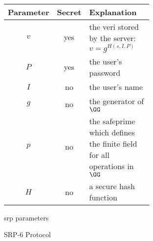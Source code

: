 \begin{figure}[H]
  \centering

  \begin{tabular}{ |c|c|p{0.7\linewidth}| }
    \hline
    Parameter & Secret & Explanation \\
    \hline
    $v$ & yes & the \gls{veri}\label{text:srp-verifier-generation} stored by the server: $v=g^{H(s,I,P)}$ \\ \hline
    $P$ & yes & the user's password \\ \hline
    $I$ & no & the user's name \\ \hline
    $g$ & no & the generator of $\GG$ \\ \hline
    $p$ & no & the \gls{safeprime} which defines the finite field for all operations in $\GG$ \\ \hline
    $H$ & no & a secure hash function \\ \hline
  \end{tabular}

  \caption{\gls{srp} parameters}
  \label{fig:srp-shared-params}
\end{figure}

\begin{figure}[H]

  \caption{SRP-6 Protocol}
  \label{fig:srp}
\end{figure}

\clearpage

